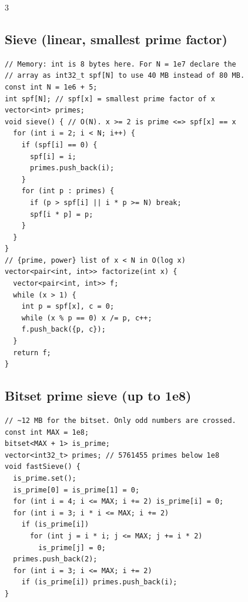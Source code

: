\documentclass[8pt, a4paper]{article}
\begin{document}
\begin{multicols*}{3}
\subsection{Sieve (linear, smallest prime factor)}
\begin{lstlisting}
// Memory: int is 8 bytes here. For N = 1e7 declare the
// array as int32_t spf[N] to use 40 MB instead of 80 MB.
const int N = 1e6 + 5;
int spf[N]; // spf[x] = smallest prime factor of x
vector<int> primes;
void sieve() { // O(N). x >= 2 is prime <=> spf[x] == x
  for (int i = 2; i < N; i++) {
    if (spf[i] == 0) {
      spf[i] = i;
      primes.push_back(i);
    }
    for (int p : primes) {
      if (p > spf[i] || i * p >= N) break;
      spf[i * p] = p;
    }
  }
}
// {prime, power} list of x < N in O(log x)
vector<pair<int, int>> factorize(int x) {
  vector<pair<int, int>> f;
  while (x > 1) {
    int p = spf[x], c = 0;
    while (x % p == 0) x /= p, c++;
    f.push_back({p, c});
  }
  return f;
}
\end{lstlisting}
\subsection{Bitset prime sieve (up to 1e8)}
\begin{lstlisting}
// ~12 MB for the bitset. Only odd numbers are crossed.
const int MAX = 1e8;
bitset<MAX + 1> is_prime;
vector<int32_t> primes; // 5761455 primes below 1e8
void fastSieve() {
  is_prime.set();
  is_prime[0] = is_prime[1] = 0;
  for (int i = 4; i <= MAX; i += 2) is_prime[i] = 0;
  for (int i = 3; i * i <= MAX; i += 2)
    if (is_prime[i])
      for (int j = i * i; j <= MAX; j += i * 2)
        is_prime[j] = 0;
  primes.push_back(2);
  for (int i = 3; i <= MAX; i += 2)
    if (is_prime[i]) primes.push_back(i);
}
\end{lstlisting}

\end{multicols*}
\end{document}
